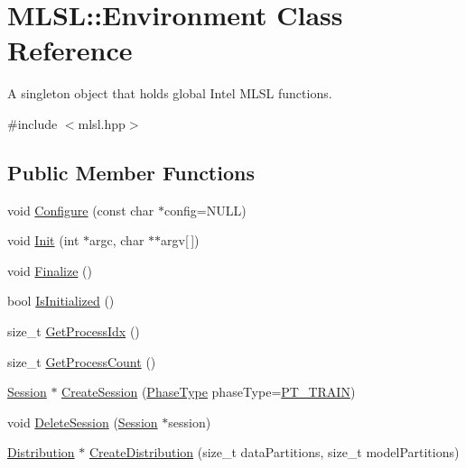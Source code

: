 \hypertarget{classMLSL_1_1Environment}{\section{M\-L\-S\-L\-:\-:Environment Class Reference}
\label{classMLSL_1_1Environment}
}


A singleton object that holds global Intel M\-L\-S\-L functions.  




{\ttfamily \#include $<$mlsl.\-hpp$>$}

\subsection*{Public Member Functions}
\begin{DoxyCompactItemize}
\item 
void \hyperlink{classMLSL_1_1Environment_a9be813a8ed0b85dc3a8839e51473e6c0}{Configure} (const char $\ast$config=N\-U\-L\-L)
\item 
void \hyperlink{classMLSL_1_1Environment_ae67919c3898381047079de60ba8d7a06}{Init} (int $\ast$argc, char $\ast$$\ast$argv\mbox{[}$\,$\mbox{]})
\item 
void \hyperlink{classMLSL_1_1Environment_a90ebcccc5b469bbb2e32a840aaca4192}{Finalize} ()
\item 
bool \hyperlink{classMLSL_1_1Environment_a85d1ab0f45d26251438895945c34b02c}{Is\-Initialized} ()
\item 
size\-\_\-t \hyperlink{classMLSL_1_1Environment_ae50e6d87304ebdd530337ad33f61d16c}{Get\-Process\-Idx} ()
\item 
size\-\_\-t \hyperlink{classMLSL_1_1Environment_a23eaf9e8d9414aa192823f1fad15c490}{Get\-Process\-Count} ()
\item 
\hyperlink{classMLSL_1_1Session}{Session} $\ast$ \hyperlink{classMLSL_1_1Environment_a5b697cdcd3483460e943ee31938feda8}{Create\-Session} (\hyperlink{namespaceMLSL_a7d1938ee24117d29200c2d29562db712}{Phase\-Type} phase\-Type=\hyperlink{namespaceMLSL_a7d1938ee24117d29200c2d29562db712a1c904b49427b2bbe7e84ee65ad939f05}{P\-T\-\_\-\-T\-R\-A\-I\-N})
\item 
void \hyperlink{classMLSL_1_1Environment_a536bbc70aaf25a82e492fc8b7a2b9dfe}{Delete\-Session} (\hyperlink{classMLSL_1_1Session}{Session} $\ast$session)
\item 
\hyperlink{classMLSL_1_1Distribution}{Distribution} $\ast$ \hyperlink{classMLSL_1_1Environment_af205e0f9d6fc31d562264d4d40f75af8}{Create\-Distribution} (size\-\_\-t data\-Partitions, size\-\_\-t model\-Partitions)
$$
\end{DoxyCompactItemize}

